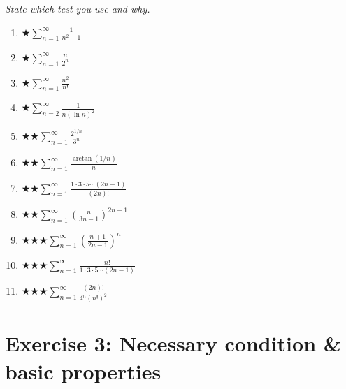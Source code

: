 \documentclass[12pt,a4paper]{article}
\newcommand{\easy}{{\color{green!60!black}$\bigstar$}}
\newcommand{\medium}{{\color{orange}$\bigstar\bigstar$}}
\newcommand{\hard}{{\color{red}$\bigstar\bigstar\bigstar$}}
\begin{document}
\emph{State which test you use and why.}

\begin{enumerate}[leftmargin=*, label=(\alph*)]

\item \easy\quad $\displaystyle\sum_{n=1}^{\infty}\frac{1}{n^2+1}$

\item \easy\quad $\displaystyle\sum_{n=1}^{\infty}\frac{n}{2^n}$

\item \easy\quad $\displaystyle\sum_{n=1}^{\infty}\frac{n^2}{n!}$

\item \easy\quad $\displaystyle\sum_{n=2}^{\infty}\frac{1}{n(\ln n)^2}$

\item \medium\quad $\displaystyle\sum_{n=1}^{\infty}\frac{2^{1/n}}{3^n}$

\item \medium\quad $\displaystyle\sum_{n=1}^{\infty}\frac{\arctan(1/n)}{n}$

\item \medium\quad $\displaystyle\sum_{n=1}^{\infty}\frac{1\cdot 3\cdot 5\cdots(2n-1)}{(2n)!}$

\item \medium\quad $\displaystyle\sum_{n=1}^{\infty}\left(\frac{n}{3n-1}\right)^{2n-1}$

\item \hard\quad $\displaystyle\sum_{n=1}^{\infty}\left(\frac{n+1}{2n-1}\right)^n$

\item \hard\quad $\displaystyle\sum_{n=1}^{\infty}\frac{n!}{1\cdot 3\cdot 5\cdots(2n-1)}$

\item \hard\quad $\displaystyle\sum_{n=1}^{\infty}\frac{(2n)!}{4^n(n!)^2}$

\end{enumerate}

\section*{Exercise 3: Necessary condition \& basic properties}
\end{document}
